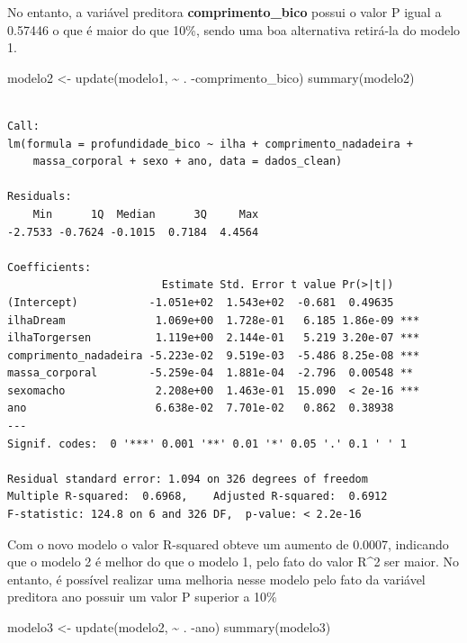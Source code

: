 \documentclass[
  letterpaper,
  DIV=11,
  numbers=noendperiod]{scrartcl}
\newenvironment{Shaded}{\begin{snugshade}}{\end{snugshade}}
\newcommand{\FunctionTok}[1]{\textcolor[rgb]{0.28,0.35,0.67}{#1}}
\newcommand{\NormalTok}[1]{\textcolor[rgb]{0.00,0.23,0.31}{#1}}
\newcommand{\OtherTok}[1]{\textcolor[rgb]{0.00,0.23,0.31}{#1}}
\newcommand{\SpecialCharTok}[1]{\textcolor[rgb]{0.37,0.37,0.37}{#1}}
\begin{document}
No entanto, a variável preditora \textbf{comprimento\_bico} possui o
valor P igual a 0.57446 o que é maior do que 10\%, sendo uma boa
alternativa retirá-la do modelo 1.

\begin{Shaded}
\begin{Highlighting}[]
\NormalTok{modelo2 }\OtherTok{\textless{}{-}} \FunctionTok{update}\NormalTok{(modelo1, }\SpecialCharTok{\textasciitilde{}}\NormalTok{ . }\SpecialCharTok{{-}}\NormalTok{comprimento\_bico)}
\FunctionTok{summary}\NormalTok{(modelo2)}
\end{Highlighting}
\end{Shaded}

\begin{verbatim}

Call:
lm(formula = profundidade_bico ~ ilha + comprimento_nadadeira + 
    massa_corporal + sexo + ano, data = dados_clean)

Residuals:
    Min      1Q  Median      3Q     Max 
-2.7533 -0.7624 -0.1015  0.7184  4.4564 

Coefficients:
                        Estimate Std. Error t value Pr(>|t|)    
(Intercept)           -1.051e+02  1.543e+02  -0.681  0.49635    
ilhaDream              1.069e+00  1.728e-01   6.185 1.86e-09 ***
ilhaTorgersen          1.119e+00  2.144e-01   5.219 3.20e-07 ***
comprimento_nadadeira -5.223e-02  9.519e-03  -5.486 8.25e-08 ***
massa_corporal        -5.259e-04  1.881e-04  -2.796  0.00548 ** 
sexomacho              2.208e+00  1.463e-01  15.090  < 2e-16 ***
ano                    6.638e-02  7.701e-02   0.862  0.38938    
---
Signif. codes:  0 '***' 0.001 '**' 0.01 '*' 0.05 '.' 0.1 ' ' 1

Residual standard error: 1.094 on 326 degrees of freedom
Multiple R-squared:  0.6968,    Adjusted R-squared:  0.6912 
F-statistic: 124.8 on 6 and 326 DF,  p-value: < 2.2e-16
\end{verbatim}

Com o novo modelo o valor R-squared obteve um aumento de 0.0007,
indicando que o modelo 2 é melhor do que o modelo 1, pelo fato do valor
R\^{}2 ser maior. No entanto, é possível realizar uma melhoria nesse
modelo pelo fato da variável preditora ano possuir um valor P superior a
10\%

\begin{Shaded}
\begin{Highlighting}[]
\NormalTok{modelo3 }\OtherTok{\textless{}{-}} \FunctionTok{update}\NormalTok{(modelo2, }\SpecialCharTok{\textasciitilde{}}\NormalTok{ . }\SpecialCharTok{{-}}\NormalTok{ano)}
\FunctionTok{summary}\NormalTok{(modelo3)}
\end{Highlighting}
\end{Shaded}
\end{document}

